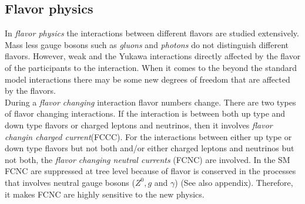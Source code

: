 \subsection{Flavor physics}
In \textit{flavor physics} the interactions between different flavors are studied extensively. Mass less gauge bosons such as \textit{gluons} and \textit{photons} do not distinguish different flavors. However, weak and the Yukawa interactions directly affected by the flavor of the participants to the interaction. When it comes to the beyond the standard model interactions there may be some new degrees of freedom that are affected by the flavors.\\
During a \textit{flavor changing} interaction flavor numbers change. There are two types of flavor changing interactions. If the interaction is between both up type and down type flavors or charged leptons and neutrinos, then it involves \textit{flavor changin charged current}(FCCC). For the interactions between either up type or down type flavors but not both and/or either charged leptons and neutrinos but not both, the \textit{flavor changing neutral currents} (FCNC) are involved. In the SM FCNC are suppressed at tree level because of flavor is conserved in the processes that involves neutral gauge bosons ($Z^0, g$ and $\gamma$) (See also appendix). Therefore, it makes FCNC are highly sensitive to the new physics.\par
